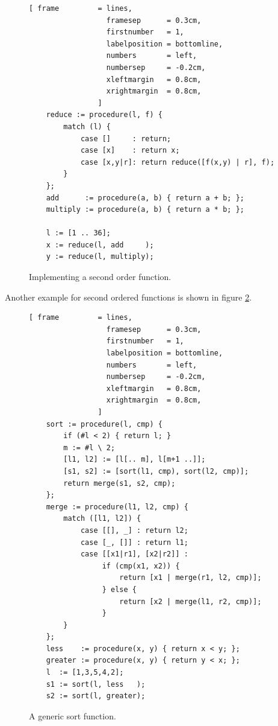 \documentclass[11pt]{report}
\begin{document}
\begin{figure}[!ht]
\centering
\begin{Verbatim}[ frame         = lines, 
                  framesep      = 0.3cm, 
                  firstnumber   = 1,
                  labelposition = bottomline,
                  numbers       = left,
                  numbersep     = -0.2cm,
                  xleftmargin   = 0.8cm,
                  xrightmargin  = 0.8cm,
                ]
    reduce := procedure(l, f) {
        match (l) {
            case []     : return;
            case [x]    : return x;
            case [x,y|r]: return reduce([f(x,y) | r], f);
        }    
    };
    add      := procedure(a, b) { return a + b; };
    multiply := procedure(a, b) { return a * b; };
    
    l := [1 .. 36];
    x := reduce(l, add     );
    y := reduce(l, multiply);
\end{Verbatim}
\vspace*{-0.3cm}
\caption{Implementing a second order function.}
\label{fig:reduce.stlx}
\end{figure}

Another example for second ordered functions is shown in figure \ref{fig:merge-sort.stlx}.

\begin{figure}[!ht]
\centering
\begin{Verbatim}[ frame         = lines, 
                  framesep      = 0.3cm, 
                  firstnumber   = 1,
                  labelposition = bottomline,
                  numbers       = left,
                  numbersep     = -0.2cm,
                  xleftmargin   = 0.8cm,
                  xrightmargin  = 0.8cm,
                ]
    sort := procedure(l, cmp) {
        if (#l < 2) { return l; }
        m := #l \ 2;
        [l1, l2] := [l[.. m], l[m+1 ..]];
        [s1, s2] := [sort(l1, cmp), sort(l2, cmp)];
        return merge(s1, s2, cmp);
    };
    merge := procedure(l1, l2, cmp) {
        match ([l1, l2]) {
            case [[], _] : return l2;
            case [_, []] : return l1;
            case [[x1|r1], [x2|r2]] : 
                 if (cmp(x1, x2)) {
                     return [x1 | merge(r1, l2, cmp)];
                 } else {
                     return [x2 | merge(l1, r2, cmp)];
                 }
        }
    };
    less    := procedure(x, y) { return x < y; };
    greater := procedure(x, y) { return y < x; };
    l  := [1,3,5,4,2];    
    s1 := sort(l, less   );
    s2 := sort(l, greater);
\end{Verbatim}
\vspace*{-0.3cm}
\caption{A generic sort function.}
\label{fig:merge-sort.stlx}
\end{figure}
\end{document}
